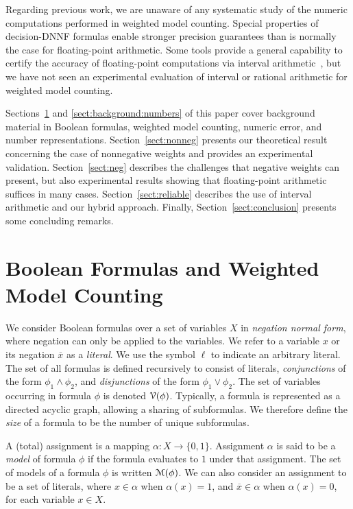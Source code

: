 \documentclass[letterpaper,USenglish,cleveref, autoref, thm-restate]{lipics-v2021}
\newcommand{\obar}[1]{\overline{#1}}
\newcommand{\lit}{\ell}
\newcommand{\varset}{X}
\newcommand{\dependencyset}{{\cal V}}
\newcommand{\assign}{\alpha}
\newcommand{\modelset}{{\cal M}}
\begin{document}
Regarding previous work, we are unaware of any 
systematic study of the numeric computations
performed in weighted model counting.  Special properties of
decision-DNNF formulas enable stronger precision guarantees than is
normally the case for floating-point arithmetic.  Some tools provide a
general capability to certify the accuracy of floating-point computations
via interval arithmetic~\cite{becker:fmcad:2016}, but we have not seen an experimental
evaluation of interval or rational arithmetic for
weighted model counting.

Sections~\ref{sect:background:boolean} and
\ref{sect:background:numbers} of this paper cover background material in Boolean
formulas, weighted model counting, numeric error, and number
representations.  Section~\ref{sect:nonneg} presents our
theoretical result concerning the case of nonnegative weights and
provides an experimental validation.  
Section~\ref{sect:neg} describes the challenges that negative
weights can present, but also experimental results showing that
floating-point arithmetic suffices in many cases.
Section~\ref{sect:reliable} describes the use of interval
arithmetic and our hybrid approach.  
Finally, Section~\ref{sect:conclusion}
presents some concluding remarks.


\section{Boolean Formulas and Weighted Model Counting}
\label{sect:background:boolean}

We consider Boolean formulas over a set of variables $\varset$ in
\emph{negation normal form}, where negation can only be applied to the
variables.  We refer to a variable $x$ or its negation $\obar{x}$ as a
\emph{literal}.  We use the symbol $\lit$ to indicate an arbitrary
literal.  The set of all formulas is defined recursively to consist of
literals, \emph{conjunctions} of the form $\phi_1 \land \phi_2$, and
\emph{disjunctions} of the form $\phi_1 \lor \phi_2$.  The set of
variables occurring in formula $\phi$ is denoted
$\dependencyset(\phi)$.  Typically, a formula is represented as a
directed acyclic graph, allowing a sharing of subformulas.  We
therefore define the \emph{size} of a formula to be the number of
unique subformulas.

A (total) assignment is a mapping $\assign \colon \varset \rightarrow
\{0, 1\}$.  Assignment $\assign$ is said to be a \emph{model} of
formula $\phi$ if the formula evaluates to $1$ under that assignment.
The set of models of a formula $\phi$ is written $\modelset(\phi)$.
We can also consider an assignment to be a set of literals, where $x \in \assign$
when $\assign(x) = 1$, and $\obar{x} \in \assign$ when
$\assign(x) = 0$, for each variable $x \in \varset$.
\end{document}
